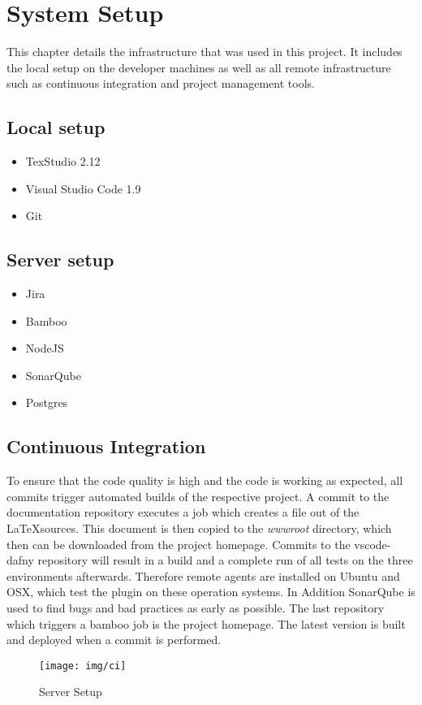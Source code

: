 \section{System Setup}
This chapter details the infrastructure that was used in this project. It includes the local setup on the developer machines as well as all remote infrastructure such as continuous integration and project management tools. 
\subsection{Local setup}
\begin{itemize}
	\item TexStudio 2.12
	\item Visual Studio Code 1.9
	\item Git
\end{itemize}
\subsection{Server setup}
\begin{itemize}
	\item Jira
	\item Bamboo
	\item NodeJS
	\item SonarQube
	\item Postgres
\end{itemize}
\subsection{Continuous Integration}
To ensure that the code quality is high and the code is working as expected, all commits trigger automated builds of the respective project. A commit to the documentation repository executes a job which creates a file out of the \LaTeX sources. This document is then copied to the \emph{wwwroot} directory, which then can be downloaded from the project homepage. Commits to the vscode-dafny repository will result in a build and a complete run of all tests on the three environments afterwards. Therefore remote agents are installed on Ubuntu and OSX, which test the plugin on these operation systems. In Addition SonarQube is used to find bugs and bad practices as early as possible. The last repository which triggers a bamboo job is the project homepage. The latest version is built and deployed when a commit is performed. 
\begin{figure}[H]
	\centering
	\texttt{[image: img/ci]}
	\caption{Server Setup}
	\label{fig:Server setup}
\end{figure}